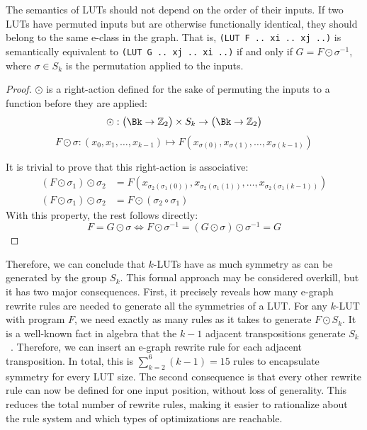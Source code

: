 The semantics of LUTs should not depend on the order of their inputs. If two
LUTs have permuted inputs but are otherwise functionally identical, they should
belong to the same e-class in the graph. That is, \mbox{\texttt{(LUT F .. xi ..
        xj ..)}} is semantically equivalent to \mbox{\texttt{(LUT G .. xj .. xi ..)}}
if and only if $G = F \odot \sigma^{-1}$, where $\sigma \in S_k$ is the
permutation applied to the inputs.

\begin{proof}
    $\odot$ is a right-action defined for the sake of permuting the inputs to a function before they are applied:
    \begin{equation*} \odot : \big (\Bk \rightarrow \mathbb{Z}_2 \big ) \times S_k \rightarrow \big (\Bk \rightarrow \mathbb{Z}_2 \big ) \end{equation*}
    \begin{equation*} F \odot \sigma : (x_0, x_1, \ldots, x_{k-1}) \mapsto F(x_{\sigma(0)}, x_{\sigma(1)}, \ldots, x_{\sigma(k-1)}) \end{equation*}

    It is trivial to prove that this right-action is associative:
    \begin{align*}
        (F \odot \sigma_1) \odot \sigma_2 & = F(x_{\sigma_2(\sigma_1(0))}, x_{\sigma_2(\sigma_1(1))}, \ldots, x_{\sigma_2(\sigma_1(k-1))}) \\
        (F \odot \sigma_1) \odot \sigma_2 & = F \odot (\sigma_2 \circ \sigma_1)
    \end{align*}
    With this property, the rest follows directly:
    \begin{equation}
        F = G \odot
        \sigma \iff F \odot \sigma^{-1} = (G \odot \sigma) \odot \sigma^{-1} = G
    \end{equation}
\end{proof}

Therefore, we can conclude that $k$-LUTs have as much symmetry as can be
generated by the group $S_k$. This formal approach may be considered overkill,
but it has two major consequences. First, it precisely reveals how many e-graph
rewrite rules are needed to generate all the symmetries of a LUT. For any
$k$-LUT with program $F$, we need exactly as many rules as it takes to generate
$F \odot S_k$. It is a well-known fact in algebra that the $k-1$ adjacent
transpositions generate $S_k$~\cite{sgroup}. Therefore, we can insert an
e-graph rewrite rule for each adjacent transposition. In total, this is
$\sum_{k=2}^{6} (k-1) = 15$ rules to encapsulate symmetry for every LUT size.
The second consequence is that every other rewrite rule can now be defined for
one input position, without loss of generality. This reduces the total number
of rewrite rules, making it easier to rationalize about the rule system and
which types of optimizations are reachable.


